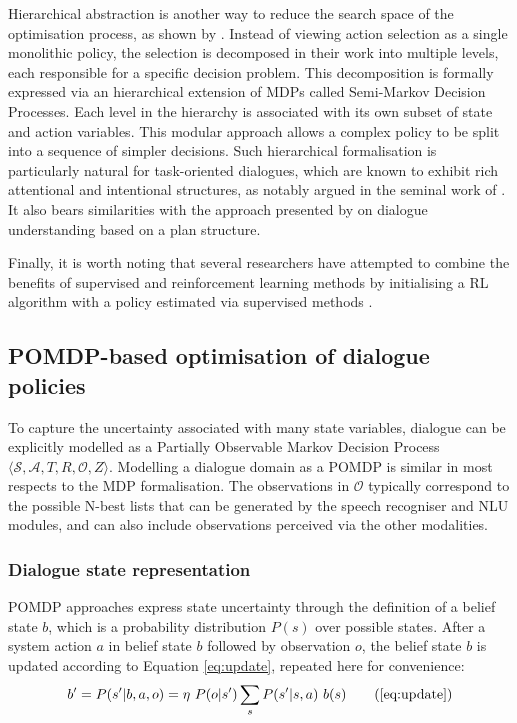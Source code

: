 Hierarchical abstraction is another way to reduce the search space of the optimisation process, as shown by \cite{Heriberto2011}. Instead of viewing action selection as a single monolithic policy, the selection is decomposed in their work into multiple levels, each responsible for a specific decision problem.  This decomposition is formally expressed via an hierarchical extension of MDPs called Semi-Markov Decision Processes.  Each level in the hierarchy is associated with its own subset of state and action variables.  This modular approach allows a complex policy to be split into a sequence of simpler decisions.  Such hierarchical formalisation is particularly natural for task-oriented dialogues, which are known to exhibit rich attentional and intentional structures, as notably argued in the seminal work of \cite{Grosz:1986}. It also bears similarities with the approach presented by \cite{Litman87} on dialogue understanding based on a plan structure. 

Finally, it is worth noting that several researchers have attempted to combine the benefits of supervised and reinforcement learning methods by initialising a RL algorithm with a policy estimated via supervised methods \citep{williams2003, rieser2006}.

\subsection{POMDP-based optimisation of dialogue policies}

To capture the uncertainty associated with many state variables, dialogue can be explicitly modelled as a Partially Observable Markov Decision Process $\langle \mathcal{S}, \mathcal{A}, T, R, \mathcal{O}, Z \rangle$.  Modelling a dialogue domain as a POMDP is similar in most respects to the MDP formalisation.  The observations in $\mathcal{O}$ typically correspond to the possible N-best lists that can be generated by the speech recogniser and NLU modules, and can also include observations perceived via the other modalities.  

\subsubsection*{Dialogue state representation}

POMDP approaches express state uncertainty through the definition of a belief state $b$, which is a probability distribution $P(s)$ over possible states.  After a system action $a$ in belief state $b$ followed by observation $o$, the belief state $b$ is updated according to Equation \eqref{eq:update}, repeated here for convenience:
\begin{align}
b' = P(s'|b, a,o) = \eta \ P(o|s') \sum_{s} P(s'|s,a) \ b(s)   \tag{\ref{eq:update}}
\end{align}

